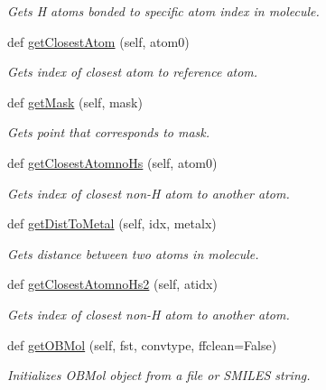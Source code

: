 \begin{DoxyCompactItemize}
\begin{DoxyCompactList}\small\item\em Gets H atoms bonded to specific atom index in molecule. \end{DoxyCompactList}\item 
def \hyperlink{classmolSimplify_1_1Classes_1_1mol3D_1_1mol3D_a6f4f405d4a3d80e9810a73a199662800}{get\+Closest\+Atom} (self, atom0)
\begin{DoxyCompactList}\small\item\em Gets index of closest atom to reference atom. \end{DoxyCompactList}\item 
def \hyperlink{classmolSimplify_1_1Classes_1_1mol3D_1_1mol3D_aae3d38b16c8876fd11e6a170b3e18df0}{get\+Mask} (self, mask)
\begin{DoxyCompactList}\small\item\em Gets point that corresponds to mask. \end{DoxyCompactList}\item 
def \hyperlink{classmolSimplify_1_1Classes_1_1mol3D_1_1mol3D_a3f137b174fb3b427893ed88d685888ce}{get\+Closest\+Atomno\+Hs} (self, atom0)
\begin{DoxyCompactList}\small\item\em Gets index of closest non-\/H atom to another atom. \end{DoxyCompactList}\item 
def \hyperlink{classmolSimplify_1_1Classes_1_1mol3D_1_1mol3D_abdd4f09ed5f39c96a5025fa9d049f2e8}{get\+Dist\+To\+Metal} (self, idx, metalx)
\begin{DoxyCompactList}\small\item\em Gets distance between two atoms in molecule. \end{DoxyCompactList}\item 
def \hyperlink{classmolSimplify_1_1Classes_1_1mol3D_1_1mol3D_a911ffafa9384284b123be8c1670220ca}{get\+Closest\+Atomno\+Hs2} (self, atidx)
\begin{DoxyCompactList}\small\item\em Gets index of closest non-\/H atom to another atom. \end{DoxyCompactList}\item 
def \hyperlink{classmolSimplify_1_1Classes_1_1mol3D_1_1mol3D_a4a723fdb1daadc53a524243198fb15cb}{get\+O\+B\+Mol} (self, fst, convtype, ffclean=False)
\begin{DoxyCompactList}\small\item\em Initializes O\+B\+Mol object from a file or S\+M\+I\+L\+ES string. \end{DoxyCompactList}\item 

\end{DoxyCompactItemize}
